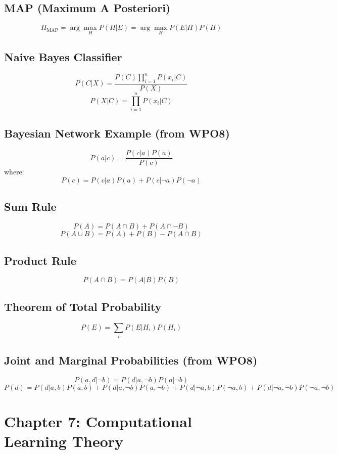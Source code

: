 \documentclass[10pt,a4paper]{article}
\begin{document}
\subsection*{MAP (Maximum A Posteriori)}
\[
H_{\text{MAP}} = \arg\max_H P(H|E) = \arg\max_H P(E|H)P(H)
\]

\subsection*{Naive Bayes Classifier}
\[
P(C|X) = \frac{P(C)\prod_{i=1}^{n}P(x_i|C)}{P(X)}
\]
\[
P(X|C) = \prod_{i=1}^{n}P(x_i|C)
\]

\subsection*{Bayesian Network Example (from WPO8)}
\[
P(a|c) = \frac{P(c|a)P(a)}{P(c)}
\]
where:
\[
P(c) = P(c|a)P(a) + P(c|\neg a)P(\neg a)
\]

\subsection*{Sum Rule}
\[
P(A) = P(A \cap B) + P(A \cap \neg B)
\]
\[
P(A \cup B) = P(A) + P(B) - P(A \cap B)
\]
\subsection*{Product Rule}
\[
P(A \cap B) = P(A|B)P(B)
\]

\subsection*{Theorem of Total Probability}
\[
P(E) = \sum_{i} P(E|H_i)P(H_i)
\]


\subsection*{Joint and Marginal Probabilities (from WPO8)}
\[
P(a, d|\neg b) = P(d|a, \neg b)P(a|\neg b)
\]
\[
P(d) = P(d|a, b)P(a, b) + P(d|a, \neg b)P(a, \neg b) + P(d|\neg a, b)P(\neg a, b) + P(d|\neg a, \neg b)P(\neg a, \neg b)
\]

\section*{Chapter 7: Computational Learning Theory}
\end{document}
